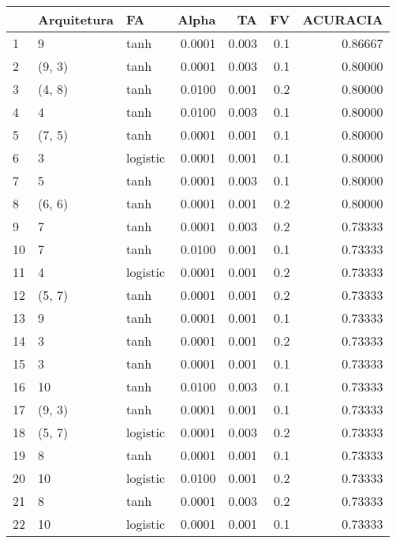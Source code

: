\begin{tabular}{lllrrrr}
\toprule
{} & Arquitetura &        FA &   Alpha &     TA &   FV &  ACURACIA \\
\midrule
1   &           9 &      tanh &  0.0001 &  0.003 &  0.1 &   0.86667 \\
2   &      (9, 3) &      tanh &  0.0001 &  0.003 &  0.1 &   0.80000 \\
3   &      (4, 8) &      tanh &  0.0100 &  0.001 &  0.2 &   0.80000 \\
4   &           4 &      tanh &  0.0100 &  0.003 &  0.1 &   0.80000 \\
5   &      (7, 5) &      tanh &  0.0001 &  0.001 &  0.1 &   0.80000 \\
6   &           3 &  logistic &  0.0001 &  0.001 &  0.1 &   0.80000 \\
7   &           5 &      tanh &  0.0001 &  0.003 &  0.1 &   0.80000 \\
8   &      (6, 6) &      tanh &  0.0001 &  0.001 &  0.2 &   0.80000 \\
9   &           7 &      tanh &  0.0001 &  0.003 &  0.2 &   0.73333 \\
10  &           7 &      tanh &  0.0100 &  0.001 &  0.1 &   0.73333 \\
11  &           4 &  logistic &  0.0001 &  0.001 &  0.2 &   0.73333 \\
12  &      (5, 7) &      tanh &  0.0001 &  0.001 &  0.2 &   0.73333 \\
13  &           9 &      tanh &  0.0001 &  0.001 &  0.1 &   0.73333 \\
14  &           3 &      tanh &  0.0001 &  0.001 &  0.2 &   0.73333 \\
15  &           3 &      tanh &  0.0001 &  0.001 &  0.1 &   0.73333 \\
16  &          10 &      tanh &  0.0100 &  0.003 &  0.1 &   0.73333 \\
17  &      (9, 3) &      tanh &  0.0001 &  0.001 &  0.1 &   0.73333 \\
18  &      (5, 7) &  logistic &  0.0001 &  0.003 &  0.2 &   0.73333 \\
19  &           8 &      tanh &  0.0001 &  0.001 &  0.1 &   0.73333 \\
20  &          10 &  logistic &  0.0100 &  0.001 &  0.2 &   0.73333 \\
21  &           8 &      tanh &  0.0001 &  0.003 &  0.2 &   0.73333 \\
22  &          10 &  logistic &  0.0001 &  0.001 &  0.1 &   0.73333 \\

\end{tabular}

